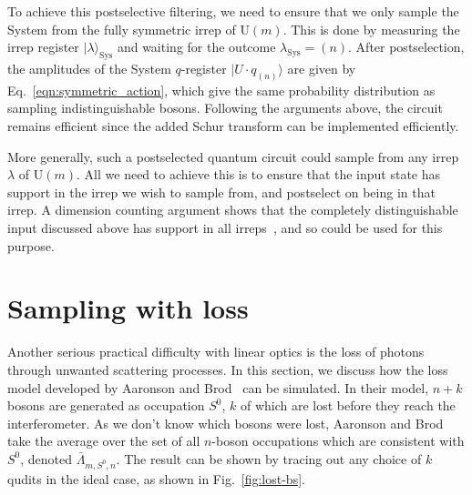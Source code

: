 To achieve this postselective filtering, we need to ensure that we only sample the System from the fully symmetric irrep of $\textrm{U}(m)$. 
This is done by measuring the irrep register $|\lambda\rangle_{\textrm{Sys}}$ and waiting for the outcome $\lambda_{\textrm{Sys}}=(n)$. 
After postselection, the amplitudes of the System $q$-register $|U\cdot q_{(n)}\rangle$ are given by Eq.~\ref{eqn:symmetric_action}, which give the same probability distribution as sampling indistinguishable bosons. 
Following the arguments above, the circuit remains efficient since the added Schur transform can be implemented efficiently. 

More generally, such a postselected quantum circuit could sample from any irrep $\lambda$ of $\textrm{U}(m)$. 
All we need to achieve this is to ensure that the input state has support in the irrep we wish to sample from, and postselect on being in that irrep.
A dimension counting argument shows that the completely distinguishable input discussed above has support in all irreps~\cite{stanisic2018}, and so could be used for this purpose.



\section{Sampling with loss}
\label{sec:nc-loss}

Another serious practical difficulty with linear optics is the loss of photons through unwanted scattering processes. 
In this section, we discuss how the loss model developed by Aaronson and Brod~\cite{aaronson2015} can be simulated. 
In their model, $n+k$ bosons are generated as occupation $S^0$, $k$ of which are lost before they reach the interferometer. 
As we don't know which bosons were lost, Aaronson and Brod take the average over the set of all $n$-boson occupations which are consistent with $S^0$, denoted $\bar{\Lambda}_{m,S^0,n}$.
The result can be shown by tracing out any choice of $k$ qudits in the ideal case, as shown in Fig.~\ref{fig:lost-bs}. 

